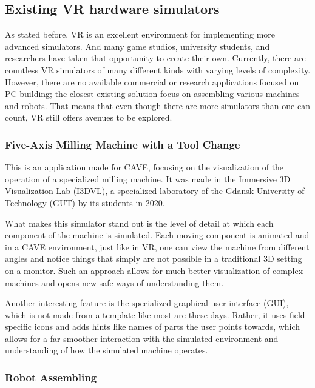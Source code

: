 \subsection{Existing VR hardware simulators}

As stated before, VR is an excellent environment for implementing more advanced simulators.
And many game studios, university students, and researchers have taken that opportunity to create their own.
Currently, there are countless VR simulators of many different kinds with varying levels of complexity.
However, there are no available commercial or research applications focused on PC building; the closest existing solution focus on assembling various machines and robots.
That means that even though there are more simulators than one can count, VR still offers avenues to be explored.

\subsubsection{Five-Axis Milling Machine with a Tool Change \cite{gdansk_university_of_technology_i3dvl_nodate}}

This is an application made for CAVE, focusing on the visualization of the operation of a specialized milling machine.
It was made in the Immersive 3D Visualization Lab (I3DVL), a specialized laboratory of the Gdansk University of Technology (GUT) by its students in 2020.

What makes this simulator stand out is the level of detail at which each component of the machine is simulated.
Each moving component is animated and in a CAVE environment, just like in VR, one can view the machine from different angles and notice things that simply are not possible in a traditional 3D setting on a monitor.
Such an approach allows for much better visualization of complex machines and opens new safe ways of understanding them.

Another interesting feature is the specialized graphical user interface (GUI), which is not made from a template like most are these days.
Rather, it uses field-specific icons and adds hints like names of parts the user points towards, which allows for a far smoother interaction with the simulated environment and understanding of how the simulated machine operates.

\subsubsection{Robot Assembling \cite{gdansk_university_of_technology_i3dvl_nodate}}

